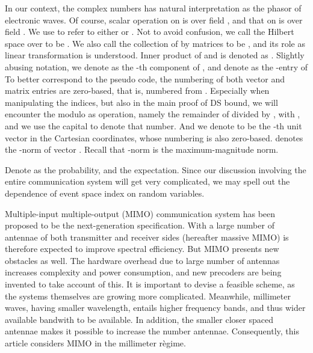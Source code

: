 In our context, the complex numbers has natural interpretation as the phasor of electronic waves.
Of course, scalar operation on  is over field , and that on  is over field .
We use  to refer to either  or .
Not to avoid confusion, we call the Hilbert space  over  to be .
We also call the collection of  by  matrices to be , and its role as linear transformation is understood.
Inner product of  and  is denoted as .
Slightly abusing notation, we denote as  the -th component of , and denote as  the -entry of 
To better correspond to the pseudo code, the numbering of both vector and matrix entries are zero-based, that is, numbered from .
Especially when manipulating the indices, but also in the main proof of DS bound, we will encounter the modulo as operation, namely the remainder of  divided by , with , and we use the capital  to denote that number.
And we denote  to be the -th unit vector in the Cartesian coordinates, whose numbering is also zero-based.
 denotes the -norm of vector .
Recall that \m {\ell_\infty}-norm is the maximum-magnitude norm.

Denote as  the probability, and  the expectation.
Since our discussion involving the entire communication system will get very complicated, we may spell out the dependence of event space index on random variables.

\stopsection
\startsection [title={Background}]

Multiple-input multiple-output (MIMO) communication system has been proposed to be the next-generation specification.
With a large number of antennae of both transmitter and receiver sides (hereafter massive MIMO) is therefore expected to improve spectral efficiency.
But MIMO presents new obstacles as well.
The hardware overhead due to large number of antennas increases complexity and power consumption, and new precoders are being invented to take account of this.
It is important to devise a feasible scheme, as the systems themselves are growing more complicated.
Meanwhile, millimeter waves, having smaller wavelength, entails higher frequency bands, and thus wider available bandwith to be available.
In addition, the smaller closer spaced antennae makes it possible to increase the number antennae.
Consequently, this article considers MIMO in the millimeter r\`egime.

